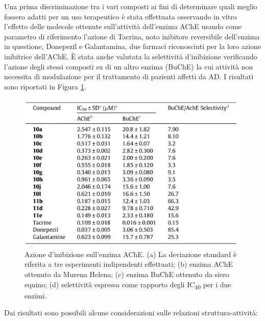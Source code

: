 \documentclass[a4paper, 12pt]{article}
\begin{document}
Una prima discriminazione tra i vari composti ai fini di determinare quali meglio fossero adatti per un uso terapeutico è stata effettuata osservando in vitro l'effetto delle molecole ottenute sull'attività dell'enzima AChE usando come parametro di riferimento l'azione di Tacrina, noto inibitore reversibile dell'enzima in questione, Donepezil e Galantamina, due farmaci riconosciuti per la loro azione inibitrice dell'AChE. È stata anche valutata la selettività d'inibizione verificando l'azione degli stessi composti su di un altro enzima (BuChE) la cui attività non necessita di modulazione per il trattamento di pazienti affetti da AD. I risultati sono riportati in Figura \ref{fig:tabellacomposti_curcdone}.

\begin{figure}[H]
	\centering
	\includegraphics[width=.8\linewidth]{immagini/tabellacomposti_curcdone.png}
	\caption{Azione d'inibizione sull'enzima AChE. (a) La deviazione standard è riferita a tre esperimenti indipendenti effettuati; (b) enzima AChE ottenuto da Murena Helena; (c) enzima BuChE ottenuto da siero equino; (d) selettività espressa come rapporto degli IC\textsubscript{40} per i due enzimi.}
	\label{fig:tabellacomposti_curcdone}
\end{figure}

Dai risultati sono possibili alcune considerazioni sulle relazioni struttura-attività:
\end{document}
